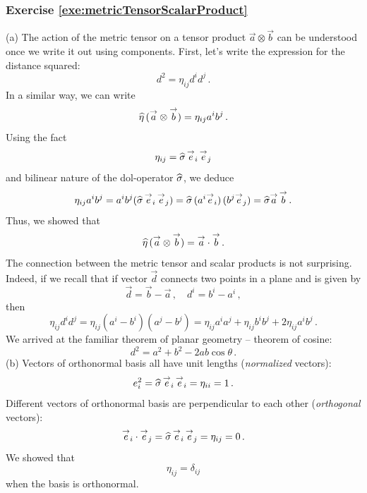 \subsubsection*{Exercise \ref{exe:metricTensorScalarProduct}}
(a) The action of the metric tensor on a tensor product
$\vec{a}\otimes\vec{b}$ can be understood once we write it out using
components. First, let's write the expression for the distance squared:
\[
d^2 = \eta_{ij}d^id^j\,.
\]
In a similar way, we can write
\[
\widehat{\eta}\,(\overset{\rightarrow}{a}\otimes\overset{\rightarrow}{b}) = \eta_{ij}a^ib^j\,.
\]
Using the fact
\[
\eta_{ij} = \widehat{\sigma}\,\overset{\rightarrow}{e}_i\,\overset{\rightarrow}{e}_j
\]
and bilinear nature of the dol-operator $\widehat{\sigma}$, we deduce
\[
\eta_{ij}a^ib^j =
a^ib^j(\widehat{\sigma}\,\overset{\rightarrow}{e}_i\,\overset{\rightarrow}{e}_j)=
\widehat{\sigma}\,(a^i\overset{\rightarrow}{e}_i)\,(b^j\overset{\rightarrow}{e}_j)=
\widehat{\sigma}\overset{\rightarrow}{a}\,\overset{\rightarrow}{b}\,.
\]
Thus, we showed that
\[
\widehat{\eta}\,(\overset{\rightarrow}{a}\otimes\overset{\rightarrow}{b}) = \overset{\rightarrow}{a}\cdot\overset{\rightarrow}{b}\,.
\]
The connection between the metric tensor and scalar products is not
surprising. Indeed, if we recall that if vector $\vec{d}$ connects two
points in a plane and is given by
\[
\vec{d} = \vec{b} - \vec{a}\,,\quad d^i = b^i - a^i\,,
\]
then
\[
\eta_{ij}d^id^j = \eta_{ij}(a^i-b^i)(a^j-b^j) = \eta_{ij}a^ia^j+\eta_{ij}b^ib^j+2\eta_{ij}a^ib^j\,.
\]
We arrived at the familiar theorem of planar geometry -- theorem of
cosine:
\[
d^2 = a^2 + b^2 - 2ab\cos\theta\,.
\]
(b) Vectors of orthonormal basis all have unit lengths
(\emph{normalized} vectors):
\[
e_i^2 = \widehat{\sigma}\, \overset{\rightarrow}{e}_i\,\overset{\rightarrow}{e}_i = \eta_{ii} = 1\,.
\]
Different vectors of orthonormal basis are perpendicular to each other
(\emph{orthogonal} vectors):
\[
\overset{\rightarrow}{e}_i\cdot\overset{\rightarrow}{e}_j = \widehat{\sigma}\, \overset{\rightarrow}{e}_i\,\overset{\rightarrow}{e}_j = \eta_{ij} = 0\,.
\]
We showed that
\[
\eta_{ij} = \delta_{ij}
\]
when the basis is orthonormal.

